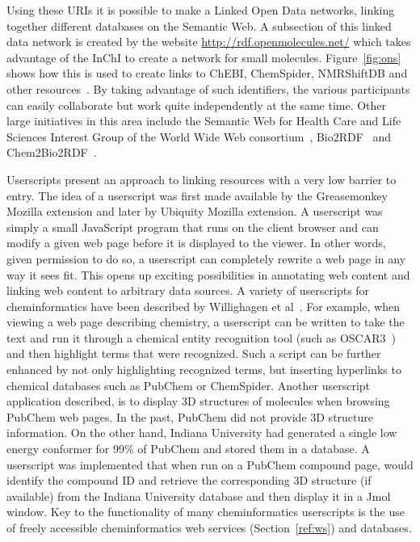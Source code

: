 \documentclass[11pt]{book}
\begin{document}
Using these URIs it is possible to make a Linked Open Data
networks, linking together different databases on the
Semantic Web. A subsection of this linked data network
is created by the website \url{http://rdf.openmolecules.net/}
which takes advantage of the InChI to create a network for
small molecules. Figure~\ref{fig:ons} shows how this is used
to create links to ChEBI, ChemSpider, NMRShiftDB and other
resources~\cite{Willighagen2010jbiomedsem}. By taking
advantage of such identifiers, the various participants
can easily collaborate but work quite independently at the
same time. Other large initiatives in this area include
the Semantic Web for Health Care and Life Sciences Interest Group of the
World Wide Web consortium~\cite{hclsig},
Bio2RDF~\cite{Belleau2008} and Chem2Bio2RDF~\cite{Chen2010}.

Userscripts present an approach to linking resources with a very low
barrier to entry. The idea of a userscript was first made available by
the Greasemonkey Mozilla extension and later by Ubiquity Mozilla
extension. A userscript was simply a small JavaScript program that
runs on the client browser and can modify a given web page before it
is displayed to the viewer. In other words, given permission to do so,
a userscript can completely rewrite a web page in any way it sees
fit. This opens up exciting possibilities in annotating web content
and linking web content to arbitrary data sources. A variety of
userscripts for cheminformatics have been described by Willighagen et
al~\cite{Willighagen2007b}. For example, when viewing a web page describing
chemistry, a userscript can be written to take the text and run it
through a chemical entity recognition tool (such as OSCAR3~\cite{Corbett2006}) and
then highlight terms that were recognized. Such a script can be further
enhanced by not only highlighting recognized terms, but inserting
hyperlinks to chemical databases such as PubChem or
ChemSpider. Another userscript application described, is to
display 3D structures of molecules when browsing PubChem web pages. In
the past, PubChem did not provide 3D structure information. On the
other hand, Indiana University had generated a single low energy
conformer for 99\% of PubChem and stored them in a database. A
userscript was implemented that when run on a PubChem compound page,
would identify the compound ID and retrieve the corresponding 3D
structure (if available) from the Indiana University database and then
display it in a Jmol window. Key to the functionality of many
cheminformatics userscripts is the use of freely accessible
cheminformatics web services (Section~\ref{ref:ws}) and databases.
\end{document}
